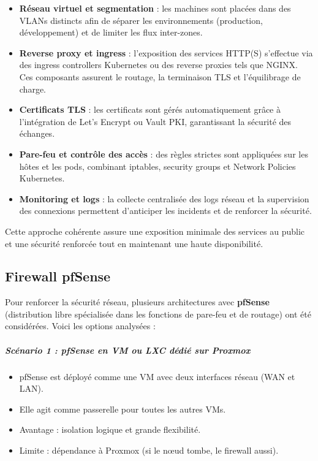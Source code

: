 \begin{itemize}
	\item \textbf{Réseau virtuel et segmentation} : les machines sont placées dans des VLANs distincts afin de séparer les environnements (production, développement) et de limiter les flux inter-zones.
	\item \textbf{Reverse proxy et ingress} : l’exposition des services HTTP(S) s’effectue via des ingress controllers Kubernetes ou des reverse proxies tels que NGINX. Ces composants assurent le routage, la terminaison TLS et l’équilibrage de charge.
	\item \textbf{Certificats TLS} : les certificats sont gérés automatiquement grâce à l’intégration de Let’s Encrypt ou Vault PKI, garantissant la sécurité des échanges.
	\item \textbf{Pare-feu et contrôle des accès} : des règles strictes sont appliquées sur les hôtes et les pods, combinant iptables, security groups et Network Policies Kubernetes.
	\item \textbf{Monitoring et logs} : la collecte centralisée des logs réseau et la supervision des connexions permettent d’anticiper les incidents et de renforcer la sécurité.
\end{itemize}

Cette approche cohérente assure une exposition minimale des services au public et une sécurité renforcée tout en maintenant une haute disponibilité.

\subsection{Firewall pfSense}

Pour renforcer la sécurité réseau, plusieurs architectures avec \textbf{pfSense} (distribution libre spécialisée dans les fonctions de pare-feu et de routage) ont été considérées. Voici les options analysées :

\subparagraph{Scénario 1 : pfSense en VM ou LXC dédié sur Proxmox}

\begin{itemize}
	\item pfSense est déployé comme une VM avec deux interfaces réseau (WAN et LAN).
	\item Elle agit comme passerelle pour toutes les autres VMs.
	\item Avantage : isolation logique et grande flexibilité.
	\item Limite : dépendance à Proxmox (si le nœud tombe, le firewall aussi).
\end{itemize}

